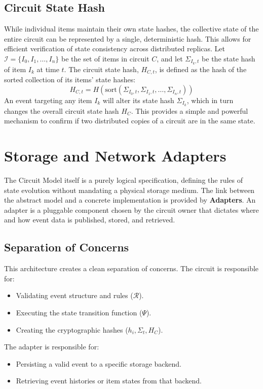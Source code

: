 \documentclass{article}
\begin{document}
\subsection{Circuit State Hash}
While individual items maintain their own state hashes, the collective state of the entire circuit can be represented by a single, deterministic hash. This allows for efficient verification of state consistency across distributed replicas. Let $\mathcal{I} = \{I_0, I_1, \dots, I_n\}$ be the set of items in circuit $C$, and let $\Sigma_{I_k, t}$ be the state hash of item $I_k$ at time $t$. The circuit state hash, $H_{C,t}$, is defined as the hash of the sorted collection of its items' state hashes:
\begin{equation}
H_{C,t} = H(\text{sort}(\Sigma_{I_0, t}, \Sigma_{I_1, t}, \dots, \Sigma_{I_n, t}))
\end{equation}
An event targeting any item $I_k$ will alter its state hash $\Sigma_{I_k}$, which in turn changes the overall circuit state hash $H_C$. This provides a simple and powerful mechanism to confirm if two distributed copies of a circuit are in the same state.

\section{Storage and Network Adapters}
The Circuit Model itself is a purely logical specification, defining the rules of state evolution without mandating a physical storage medium. The link between the abstract model and a concrete implementation is provided by \textbf{Adapters}. An adapter is a pluggable component chosen by the circuit owner that dictates where and how event data is published, stored, and retrieved.

\subsection{Separation of Concerns}
This architecture creates a clean separation of concerns. The circuit is responsible for:
\begin{itemize}
    \item Validating event structure and rules ($\mathcal{R}$).
    \item Executing the state transition function ($\Psi$).
    \item Creating the cryptographic hashes ($h_i, \Sigma_t, H_C$).
\end{itemize}
The adapter is responsible for:
\begin{itemize}
    \item Persisting a valid event to a specific storage backend.
    \item Retrieving event histories or item states from that backend.
\end{itemize}
\end{document}
